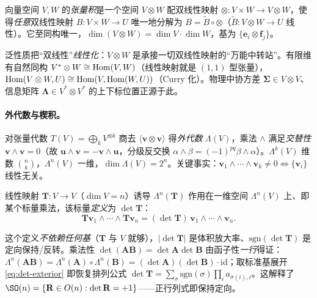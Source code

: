 \begin{definition}[张量积的泛性质]\label{def:tensor}
向量空间 $V,W$ 的\emph{张量积}是一个空间 $V\otimes W$ 配双线性映射 $\otimes:V\times W\to V\otimes W$，使得\emph{任意}双线性映射 $B:V\times W\to U$ 唯一地分解为 $B=\tilde{B}\circ\otimes$（$\tilde{B}:V\otimes W\to U$ 线性）。它至同构唯一，$\dim(V\otimes W)=\dim V\cdot\dim W$，基为 $\{\mathbf{e}_i\otimes\mathbf{f}_j\}$。
\end{definition}

\noindent 泛性质把“双线性”\emph{线性化}：$V\otimes W$ 是承接一切双线性映射的“万能中转站”。有限维有自然同构 $V^*\otimes W\cong\operatorname{Hom}(V,W)$（线性映射就是 $(1,1)$ 型张量），$\operatorname{Hom}(V\otimes W,U)\cong\operatorname{Hom}(V,\operatorname{Hom}(W,U))$（Curry 化）。物理中协方差 $\boldsymbol{\Sigma}\in V\otimes V$、信息矩阵 $\boldsymbol{\Lambda}\in V^*\otimes V^*$ 的上下标位置正源于此。

\paragraph{外代数与楔积。}
对张量代数 $T(V)=\bigoplus_k V^{\otimes k}$ 商去 $\langle\mathbf{v}\otimes\mathbf{v}\rangle$ 得\emph{外代数} $\Lambda(V)$，乘法 $\wedge$ 满足\emph{交替性} $\mathbf{v}\wedge\mathbf{v}=0$（故 $\mathbf{u}\wedge\mathbf{v}=-\mathbf{v}\wedge\mathbf{u}$，分级反交换 $\alpha\wedge\beta=(-1)^{pq}\beta\wedge\alpha$）。$\Lambda^k(V)$ 维数 $\binom{n}{k}$，$\Lambda^n(V)$ 一维，$\dim\Lambda(V)=2^n$。关键事实：$\mathbf{v}_1\wedge\cdots\wedge\mathbf{v}_k\neq0\iff\{\mathbf{v}_i\}$ 线性无关。

\begin{theorem}\label{thm:det-exterior}
线性映射 $\mathbf{T}:V\to V$（$\dim V=n$）诱导 $\Lambda^n(\mathbf{T})$ 作用在一维空间 $\Lambda^n(V)$ 上、即某个标量乘法，该标量\emph{定义}为 $\det\mathbf{T}$：
\begin{equation}
  \mathbf{T}\mathbf{v}_1\wedge\cdots\wedge\mathbf{T}\mathbf{v}_n=(\det\mathbf{T})\,\mathbf{v}_1\wedge\cdots\wedge\mathbf{v}_n.
  \label{eq:det-exterior}
\end{equation}
\end{theorem}

\noindent 这个定义\emph{不依赖任何基}（$\mathbf{T}$ 与 $V$ 就够），$|\det\mathbf{T}|$ 是体积放大率、$\mathrm{sgn}(\det\mathbf{T})$ 是定向保持/反转。乘法性 $\det(\mathbf{A}\mathbf{B})=\det\mathbf{A}\det\mathbf{B}$ 由函子性\emph{一行}得证：$\Lambda^n(\mathbf{A}\mathbf{B})=\Lambda^n(\mathbf{A})\circ\Lambda^n(\mathbf{B})=(\det\mathbf{A})(\det\mathbf{B})\cdot\mathrm{id}$；取标准基展开 \cref{eq:det-exterior} 即恢复排列公式 $\det\mathbf{T}=\sum_\sigma\mathrm{sgn}(\sigma)\prod_i a_{\sigma(i),i}$。这解释了 $\SO(n)=\{\mathbf{R}\in O(n):\det\mathbf{R}=+1\}$——正行列式即保持定向。

